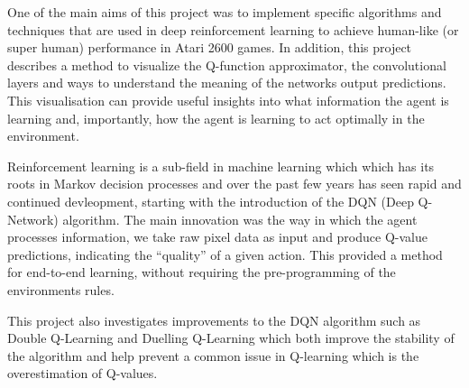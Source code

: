 One of the main aims of this project was to implement specific algorithms and techniques that are used in deep reinforcement learning to achieve human-like (or super human) performance in Atari 2600 games. In addition, this project describes a method to visualize the Q-function approximator, the convolutional layers and ways to understand the meaning of the networks output predictions. This visualisation can provide useful insights into what information the agent is learning and, importantly, how the agent is learning to act optimally in the environment.

Reinforcement learning is a sub-field in machine learning which which has its roots in Markov decision processes and over the past few years has seen rapid and continued devleopment, starting with the introduction of the DQN (Deep Q-Network) algorithm. The main innovation was the way in which the agent processes information, we take raw pixel data as input and produce Q-value predictions, indicating the ``quality'' of a given action. This provided a method for end-to-end learning, without requiring the pre-programming of the environments rules.

This project also investigates improvements to the DQN algorithm such as Double Q-Learning and Duelling Q-Learning which both improve the stability of the algorithm and help prevent a common issue in Q-learning which is the overestimation of Q-values.